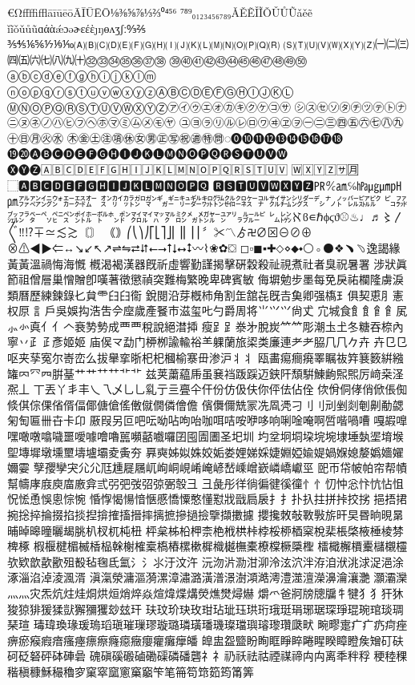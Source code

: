 €ΩﬀﬃﬄāīūēōĀĪŪĒŌ⅛⅜⅝⅞⅓⅔⁰⁴⁵⁶
⁷⁸⁹₀₁₂₃₄₅₆₇₈₉ǍĚẼǏĨǑǓŮŨǎěẽ
ǐĩǒǔůũɑάὰǽɔəɚɛέὲȷŋɵʌʒʃː↉⅖
⅗⅘⅙⅚⅐⅑⅒🄐🄑🄒🄓🄔🄕🄖🄗🄘🄙🄚🄛🄜🄝🄞🄟🄠🄡
🄢🄣🄤🄥🄦🄧🄨🄩㈠㈡㈢㈣㈤㈥㈦㈧㈨㈩㉜㉝㉞㉟㊱㊲㊳
㊴㊵㊶㊷㊸㊹㊺㊻㊼㊽㊾㊿ⓐⓑⓒⓓⓔⓕⓖⓗⓘⓙⓚⓛⓜ
ⓝⓞⓟⓠⓡⓢⓣⓤⓥⓦⓧⓨⓩⒶⒷⒸⒹⒺⒻⒼⒽⒾⒿⓀⓁ
ⓂⓃⓄⓅⓆⓇⓈⓉⓊⓋⓌⓍⓎⓏ㋐㋑㋒㋓㋔㋕㋖㋗㋘㋙㋚
㋛㋜㋝㋞㋟㋠㋡㋢㋣㋤㋥㋦㋧㋨㋩㋪㋫㋬㋭㋮㋯㋰㋱㋲㋳
㋴㋵㋶㋷㋸㋹㋺㋻㋼㋽㋾㊀㊁㊂㊃㊄㊅㊆㊇㊈㊉㊐㊊㊋㊌
㊍㊎㊏㊟㊠㊡㊛㊚㊣㊢㊗㊜㊕㉄◌⓿❿⓫⓬⓭⓮⓯⓰⓱⓲
⓳⓴🅐🅑🅒🅓🅔🅕🅖🅗🅘🅙🅚🅛🅜🅝🅞🅟🅠🅡🅢🅣🅤🅥🅦
🅧🅨🅩🄰🄱🄲🄳🄴🄵🄶🄷🄸🄹🄺🄻🄼🄽🄾🄿🅀🅁🅂🅃🅄🅅
🅆🅇🅈🅉🈂🈷⃞⬚🅰🅱🅲🅳🅴🅵🅶🅷🅸🅹🅺🅻🅼🅽🅾🅿🆀
🆁🆂🆃🆄🆅🆆🆇🆈🆉㏚℀㏂℅㍱㎍㎛㏗㏘㌁㌂㌄㌆㌈㌇㌊
㌉㌋㌌㌎㌏㌐㌑㌒㌓㌗㌙㌚㌛㌜㌝㌟㌠㌡㌤㌥㌨㌩㌭㌮㌯
㌰㌲㌴㌵㌼㌷㌸㌺㌽㍁㌾㌿㍀㍃㍄㍅㍆㍈㍋㍌㍏㍐㍒㍔㍓
㍕㍖ℵϐ∊ℏϕϛϑ⚾♨♩♬〻〳〴〵‼⁉∓≃≲≳〘〙
｟｠⎛⎝⎞⎠⎡⎣⎤⎦⎜⎟⎢⎥⎪〞✂〽ゟ࿖∅⊠⊖⊘⊕
⊗⚠◀▶⇐↔↘↙↖↗⇌⇋⮂⮃⭠⭢⭡⭣⭤⭥〰⌇❀✿⛋
◻▫◼▪✚⬦⋄⬥⬩⚪◦⚫❖﹅﹆逸謁緣⿈黃溫禍悔海慨
槪渴褐漢器既祈虛響勤謹揭擊硏穀殺祉視煮社者臭祝暑署
涉狀眞節祖僧層巢憎贈卽嘆著徵懲禎突難梅繁晚卑碑賓敏
侮塀勉步墨每免戾祐欄隆虜淚類曆歷練鍊錄𠤎貟⻗⺽𦥑𫟘
銳閱沿芽槪杮⻆割𦈢舘㐂旣𠮷𩵋卿强𫞎⺩俱契恵⺼憲权𠩤
訁戶吳娛抅浩吿𫝆𫝷歲產䬸巿滋玺𠮟勺爵周将⺌𭕄⺍尙𠀋
宂城⻝⻟飠⻞𩙿㞍⺗㣺真⺅亻𠆢𮕩㔟𫝑成⻃覀稅說絕澘揷
瘦⻊𧾷𣳾㐧脫炭⺮𥫗彫潮圡𡈽冬糖吞㮈內寧丷⺪𤴔彥姬姬
庙㑨龴勐门𫞉栁諭輸𥙿⺷躶蘭旅鿄类廉連⺹耂𦚰⺇𠘨𠂊𠦄
卉⺋㔾呕夹孶寃尔㟢峦么拔𦦙挛晣𣏌杞槶榆𪧦毌渗沪⺦丬
瓯畵痬癎㾱睪瞩鿆筓𫞽䉤絣繈𮉸𠔿⺳𦉪腁䑓艹⺾艹⺿艹⻀
兹荚䔥藴𠂰虽㐮裆䟦𮛪迈𨦇𨸗頹騈鯟𫠚𤋮𤋮厉﨑桒𣲾𠘑丄
丅丟丫丯丰乀乁乄⺃乚乿亍亖亹仐仠份仿伋伕你伻佉佔佺
佽佾侗侾俏俽倀倁倐倛倧倮偗偦偪倻傏傖傜僌僦僩僯儈儋
儐儛儞兟冡冼凮凴刁⺉刂刓剉剡剦劓勈勰匊匋匾卌卋卡卬
厫叚另叵吧呍呦呫呴咍咖咡咭咹咿哆响唎唫唵啊啠喈喎嘈
嘎嘏嘷嘿噉噋噏噦噩噯噱噲嚕嚚嚬嚭嚱囉囝囤圊圕圣圯圳
圴坌坰垌垜垸埦埭埵埶埿堉堠堲塼墀墩壎壐壔壚壩夌夤夯
奡奭姊姒姝姣姤娄娌娣婇婕婣婭婾媞媧媬媳嫠嬀嬙嬥嬭孁
孼孾孿宊⺏尣尫尰屣屩屼峋峒峴崤崦嵃嵆嵊嶒嶔嶙嶠巘巠
巸帀帒帔帕帘帮幘幫幬庨庪庾庿廒弇弎弜弝弢弨弶弻彀⼹
彐彘彤徉徜徧徤徯徸⺖忄忉忡忩忭忼怗怚怳恡恿悞悤悰惋
惛惸愒愓愔愜慼憍憟憨懂懟戕戩扃扆⺘扌扑扖拄拼挊挍挘
挹捂捃捥捴捽掄掇掐掞揑揜搉搐搢摔摛摭摻撾撿擥擷擻攄
攖攙敇敧斁斅旂旰旲昬晌晛晜晡晫暤曈曬朅朓朳杈杌杶杻
枰枲柹柗柙柰栬栰栱桛桲桵桺梄梥梲棐棖棨棭棰棱棼椑椓
椵椻楗楣楲楿榀榦榭榷槖槗樁樏樕樨樴樾橅橐橑橖橛檃檉
檑檝檞檟櫜櫧櫬欞欤欵歆歖歠殂殾毡毱氐氳氵⺡⺢汙汶汻
沅沕沜泐泔泖泠泫泬泮洊洎洑洮浗浞浥涂涿淄淊淖淩渢湑
滇滊滎滽漚漪漯漳潚潞潢潽澋澍澒澔澚澧澨澶濚濞瀹瀼灔
灝灞灤⺣灬灾炁炕炷烓烔烘烜焇焠焱煊煒煠煹熒燋燓燖爀
爝爫爸牁牓牕牖牜犍⺨犭犴狇狻猄猅猨猱獃獬獼玃玅玆玕
玞玟玠玦玫玵玷玼珏珙珩珴珽琄琊琚琛琤琨琬琯琰琱琹瑄
瑇瑋瑍瑑瑗瑦瑫瑱璀璅璆璇璐璘璜璠璣璨璫璵璿瓈瓚瓞畎
畹疁疐⽧疒疓疴痤痹瘀瘊瘕瘖瘙瘞瘭瘵癃癋癥癭癯癱癴皤
皥盅盌盬盼眴眶睜睟睠睲睽瞕瞪矦矰矴砆砢砭砮砰砵硨碞
磈磌磎磤磠磡磲磷磻礱⺭礻礽祅祛祜禋禖禘⽱禸离秊秚稃
稉稑稞稭稹穅穌穝穭穸窠窣窳窻窼竆笇笔笧笱筇筎筠筩筭
